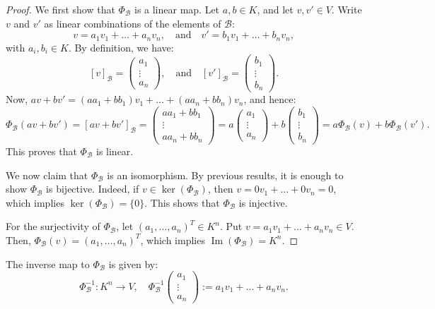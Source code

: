 \begin{proof}
We first show that $\Phi_{\mathcal{B}}$ is a linear map. Let $a, b \in K$, and let $v, v' \in V$. Write $v$ and $v'$ as linear combinations of the elements of $\mathcal{B}$:
\[
v = a_1 v_1 + \dots + a_n v_n, \quad \text{and} \quad v' = b_1 v_1 + \dots + b_n v_n,
\]
with $a_i, b_i \in K$. By definition, we have:
\[
[v]_{\mathcal{B}} = 
\begin{pmatrix}
a_1 \\
\vdots \\
a_n
\end{pmatrix},
\quad \text{and} \quad
[v']_{\mathcal{B}} = 
\begin{pmatrix}
b_1 \\
\vdots \\
b_n
\end{pmatrix}.
\]
Now, $a v + b v' = (a a_1 + b b_1) v_1 + \dots + (a a_n + b b_n) v_n$, and hence:
\[
\Phi_{\mathcal{B}}(a v + b v') = [a v + b v']_{\mathcal{B}} = 
\begin{pmatrix}
a a_1 + b b_1 \\
\vdots \\
a a_n + b b_n
\end{pmatrix}
= a 
\begin{pmatrix}
a_1 \\
\vdots \\
a_n
\end{pmatrix}
+ b
\begin{pmatrix}
b_1 \\
\vdots \\
b_n
\end{pmatrix}
= a \Phi_{\mathcal{B}}(v) + b \Phi_{\mathcal{B}}(v').
\]
This proves that $\Phi_{\mathcal{B}}$ is linear. 

We now claim that $\Phi_{\mathcal{B}}$ is an isomorphism. By previous results, it is enough to show $\Phi_{\mathcal{B}}$ is bijective. Indeed, if $v \in \ker(\Phi_{\mathcal{B}})$, then $v = 0 v_1 + \dots + 0 v_n = 0$, which implies $\ker(\Phi_{\mathcal{B}}) = \{0\}$. This shows that $\Phi_{\mathcal{B}}$ is injective. 

For the surjectivity of $\Phi_{\mathcal{B}}$, let $(a_1, \dots, a_n)^T \in K^n$. Put $v = a_1 v_1 + \dots + a_n v_n \in V$. Then, $\Phi_{\mathcal{B}}(v) = (a_1, \dots, a_n)^T$, which implies $\operatorname{Im}(\Phi_{\mathcal{B}}) = K^n$.
\end{proof}

\begin{remark}
The inverse map to $\Phi_{\mathcal{B}}$ is given by:
\[
\Phi_{\mathcal{B}}^{-1}: K^n \to V, \quad \Phi_{\mathcal{B}}^{-1}
\begin{pmatrix}
a_1 \\
\vdots \\
a_n
\end{pmatrix}
:= a_1 v_1 + \dots + a_n v_n.
\]
\end{remark}

